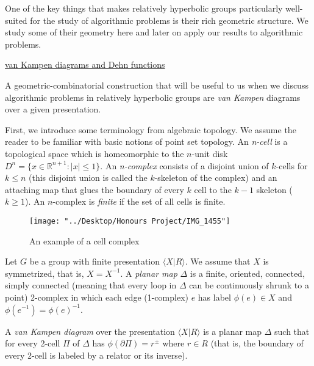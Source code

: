 \documentclass[12pt]{article}
\newcommand{\vs}{\vskip10pt}
\begin{document}
	One of the key things that makes relatively hyperbolic groups particularly well-suited for the study of algorithmic problems is their rich geometric structure. We study some of their geometry here and later on apply our results to algorithmic problems. 
	
	\vs 
	
	\underline{van Kampen diagrams and Dehn functions}
	
	\vs 
	
	A geometric-combinatorial construction that will be useful to us when we discuss algorithmic problems in relatively hyperbolic groups are \textit{van Kampen} diagrams over a given presentation. 
	
	\vs 
	
	First, we introduce some terminology from algebraic topology. We assume the reader to be familiar with basic notions of point set topology. An \textit{n-cell} is a topological space which is homeomorphic to the $n$-unit disk $D^n = \{x \in \mathbb{R}^{n+1}: \vert x \vert \leq 1\}$. An \textit{n-complex} consists of a disjoint union of $k$-cells for $k \leq n$ (this disjoint union is called the $k$-skeleton of the complex) and an attaching map that glues the boundary of every $k$ cell to the $k-1$ skeleton ($k \geq 1$). An $n$-complex is \textit{finite} if the set of all cells is finite. 
	
\begin{figure} [H]
	\centering
	\texttt{[image: "../Desktop/Honours Project/IMG\_1455"]}
	\caption{An example of a cell complex}
	\label{fig:img1455}
\end{figure}
	
	\vs 
	
	Let $G$ be a group with finite presentation $\langle X \vert R \rangle$. We assume that $X$ is symmetrized, that is, $X = X^{-1}$. A \textit{planar map} $\Delta$ is a finite, oriented, connected, simply connected (meaning that every loop in $\Delta$ can be continuously shrunk to a point) 2-complex in which each edge (1-complex) $e$ has label $\phi(e) \in X$ and $\phi(e^{-1}) = \phi(e)^{-1}$. 
	
	\vs
	
	A \textit{van Kampen diagram} over the presentation $\langle X \vert R \rangle$ is a planar map $\Delta$ such that for every 2-cell $\Pi$ of $\Delta$ has $\phi(\partial \Pi) = r^{\pm}$ where $r \in R$ (that is, the boundary of every 2-cell is labeled by a relator or its inverse). 
	
	\vs 
	
\end{document}
